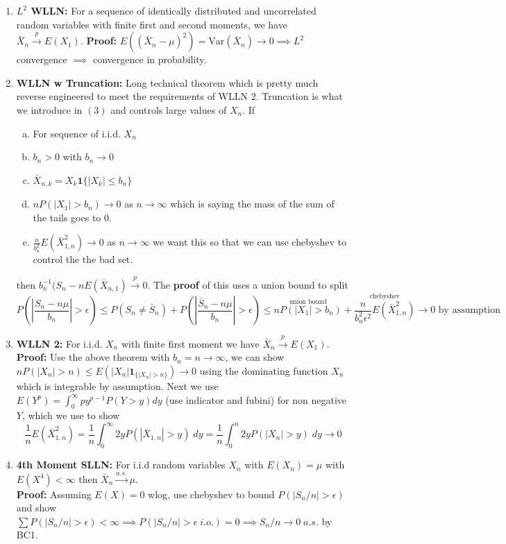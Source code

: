 \documentclass{article}
\begin{document}
\begin{enumerate}
    \item \textbf{\(L^2\) WLLN:} For a sequence of identically distributed and uncorrelated random variables with finite first and second moments, we have \(\bar X_n \overset{p}{\to} E(X_1)\). \textbf{Proof:} \(E((\bar X_n-\mu)^2) = \text{Var}(\bar X_n) \to 0 \implies L^2\) convergence \(\implies \) convergence in probability.

    \item \textbf{WLLN w Truncation:} Long technical theorem which is pretty much reverse engineered to meet the requirements of WLLN 2. Truncation is what we introduce in \((3)\) and controls large values of \(X_n\). If 
    \begin{enumerate} [a.]
        \item For sequence of i.i.d. \(X_n\)
        \item \(b_n>0\) with \(b_n \to 0\)
        \item \(\bar X_{n,k} = X_k\mathbf{1}\{|X_k|\leq b_n\}\)
        \item \(nP(|X_1|> b_n) \to 0\) as \(n \to \infty\) which is saying the mass of the sum of the tails goes to 0.
        \item \(\frac{n}{b^2_n}E(\bar X^2_{1,n}) \to 0\) as \(n \to \infty\) we want this so that we can use chebyshev to control the the bad set.
    \end{enumerate}
    then \(b_n^{-1}(S_n - n E(\bar X_{n,1}) \overset{p}{\to}0\). The \textbf{proof} of this uses a union bound to split
    \[
    P\left(\left|\frac{S_n - n\mu}{b_n}\right| > \epsilon \right) \leq P(S_n \neq \bar S_n) + P\left(\left|\frac{\bar S_n - n\mu}{b_n}\right| > \epsilon \right)
    \leq \overset{\text{union bound}}{nP(|X_1| > b_n)} + \overset{\text{chebyshev}}{\frac{n}{b_n^2\epsilon^2}E(\bar X^2_{1,n})}
    \to 0 \text{ by assumption}
    \]

    \item \textbf{WLLN 2:} For i.i.d. \(X_n\) with finite first moment we have \(\bar X_n \overset{p}{\to} E(X_1)\).\\

    \textbf{Proof:} Use the above theorem with \(b_n = n \to \infty\), we can show \(nP(|X_n| > n) \leq E(|X_n|\mathbf{1}_{\{|X_n|>n\}}) \to 0 \) using the dominating function \(X_n\) which is integrable by assumption. Next we use \(E(Y^p) = \int_0^\infty py^{p-1}P(Y>y)dy\) (use indicator and fubini) for non negative \(Y\), which we use to show
    \[
    \frac{1}{n}E(\bar X^2_{1,n}) = \frac{1}{n}\int^\infty_0 2yP(|\bar X_{1,n}| > y)\;dy = \frac{1}{n}\int^n_0 2yP(|X_{n}| > y)\;dy \to 0
    \]

    \item \textbf{4th Moment SLLN:} For i.i.d random variables \(X_n\) with \(E(X_n)= \mu\) with \(E(X^4)< \infty\) then \(\bar X_n \overset{a.s.}{\to}\mu\). \\

    \textbf{Proof:} Assuming \(E(X) = 0\) wlog, use chebyshev to bound \(P(|S_n/n|> \epsilon)\) and show \(\sum P(|S_n/n| > \epsilon) < \infty \implies P(|S_n/n| > \epsilon \; i.o.) = 0 \implies S_n/n \to 0 \; a.s.\) by BC1.

    \end{enumerate}
\end{document}
